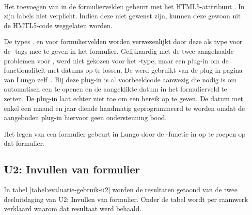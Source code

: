  
\paragraph{\lungo} 
Het toevoegen van  in de formuliervelden gebeurt met het HTML5-atttribuut .
In \lungo{} zijn labels niet verplicht.
Indien deze niet gewenst zijn, kunnen deze gewoon uit de HMTL5-code weggelaten worden.

De types ,  en  voor formuliervelden worden verwezenlijkt door deze als type voor de -tags mee te geven in het formulier.
Gelijkaardig met de twee aangehaalde problemen voor \jqm{}, werd niet gekozen voor het -type, maar een plug-in om de functionaliteit met datums op te lossen.
De  werd gebruikt van de plug-in pagina van Lungo zelf~\cite{TapQuo2013b}.
Bij deze plug-in is al voorbeeldcode aanwezig die nodig is om automatisch een  te openen en de aangeklikte datum in het formulierveld te zetten.
De plug-in laat echter niet toe om een bereik op te geven.
De datum met enkel een maand en jaar diende handmatig geprogrammeerd te worden omdat de aangeboden plug-in hiervoor geen ondersteuning bood.

Het legen van een formulier gebeurt in Lungo door de -functie in \js{} op te roepen op dat formulier.


\subsection{U2: Invullen van formulier}
In tabel \ref{tabel:evaluatie-gebruik-u2} worden de resultaten getoond van de twee deeluitdaging van U2: Invullen van formulier.
Onder de tabel wordt per raamwerk verklaard waarom dat resultaat werd behaald.

\begin{table}[H]
\centering
{}
\caption{Gebruik voor U2: Invullen van formulier}
\label{tabel:evaluatie-gebruik-u2}
\end{table}

